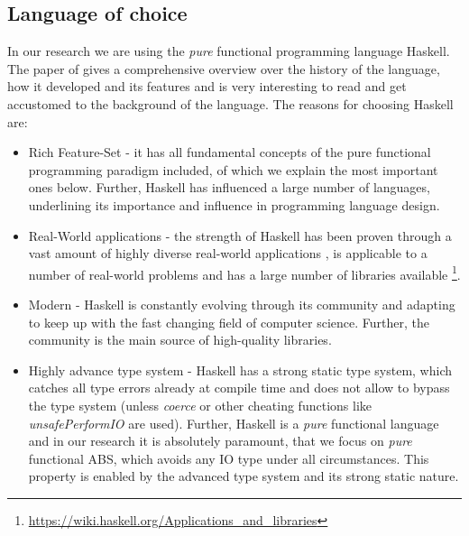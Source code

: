 \subsection{Language of choice}
In our research we are using the \textit{pure} functional programming language Haskell. The paper of \cite{hudak_history_2007} gives a comprehensive overview over the history of the language, how it developed and its features and is very interesting to read and get accustomed to the background of the language. The reasons for choosing Haskell are:

\begin{itemize}
	\item Rich Feature-Set - it has all fundamental concepts of the pure functional programming paradigm included, of which we explain the most important ones below. Further, Haskell has influenced a large number of languages, underlining its importance and influence in programming language design.
	
	\item Real-World applications - the strength of Haskell has been proven through a vast amount of highly diverse real-world applications \cite{hudak_haskell_1994, hudak_history_2007}, is applicable to a number of real-world problems \cite{osullivan_real_2008} and has a large number of libraries available \footnote{\url{https://wiki.haskell.org/Applications_and_libraries}}.
	
	\item Modern - Haskell is constantly evolving through its community and adapting to keep up with the fast changing field of computer science. Further, the community is the main source of high-quality libraries.
	
	\item Highly advance type system - Haskell has a strong static type system, which catches all type errors already at compile time and does not allow to bypass the type system (unless \textit{coerce} or other cheating functions like \textit{unsafePerformIO} are used). Further, Haskell is a \textit{pure} functional language and in our research it is absolutely paramount, that we focus on \textit{pure} functional ABS, which avoids any IO type under all circumstances. This property is enabled by the advanced type system and its strong static nature.
\end{itemize}

